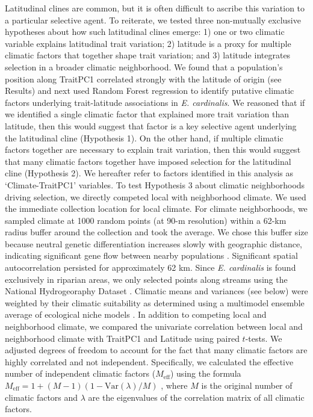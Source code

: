 \documentclass[11pt, oneside]{article}
\begin{document}
Latitudinal clines are common, but it is often difficult to ascribe this variation to a particular selective agent. To reiterate, we tested three non-mutually exclusive hypotheses about how such latitudinal clines emerge: 1) one or two climatic variable explains latitudinal trait variation; 2) latitude is a proxy for multiple climatic factors that together shape trait variation; and 3) latitude integrates selection in a broader climatic neighborhood. We found that a population's position along TraitPC1 correlated strongly with the latitude of origin (see Results) and next used Random Forest regression \citep{Liaw_Wiener_2002} to identify putative climatic factors underlying trait-latitude associations in \textit{E. cardinalis}. We reasoned that if we identified a single climatic factor that explained more trait variation than latitude, then this would suggest that factor is a key selective agent underlying the latitudinal cline (Hypothesis 1). On the other hand, if multiple climatic factors together are necessary to explain trait variation, then this would suggest that many climatic factors together have imposed selection for the latitudinal cline (Hypothesis 2). We hereafter refer to factors identified in this analysis as `Climate-TraitPC1' variables. To test Hypothesis 3 about climatic neighborhoods driving selection, we directly competed local with neighborhood climate. We used the immediate collection location for local climate. For climate neighborhoods, we sampled climate at 1000 random points (at 90-m resolution) within a 62-km radius buffer around the collection and took the average. We chose this buffer size because neutral genetic differentiation increases slowly with geographic distance, indicating significant gene flow between nearby populations \citep{Paul_etal_2016}. Significant spatial autocorrelation persisted for approximately 62 km. Since \textit{E. cardinalis} is found exclusively in riparian areas, we only selected points along streams using the National Hydrogeoraphy Dataset \citep{NHD}. Climatic means and variances (see below) were weighted by their climatic suitability as determined using a multimodel ensemble average of ecological niche models \citep{Angert_ENM}. In addition to competing local and neighborhood climate, we compared the univariate correlation between local and neighborhood climate with TraitPC1 and Latitude using paired $t$-tests. We adjusted degrees of freedom to account for the fact that many climatic factors are highly correlated and not independent. Specifically, we calculated the effective number of independent climatic factors ($M_\text{eff}$) using the formula $M_\text{eff} = 1 + (M - 1) (1 - \text{Var}(\lambda) / M)$ \citep{Chevrud_2001}, where $M$ is the original number of climatic factors and $\lambda$ are the eigenvalues of the correlation matrix of all climatic factors. 
\end{document}
